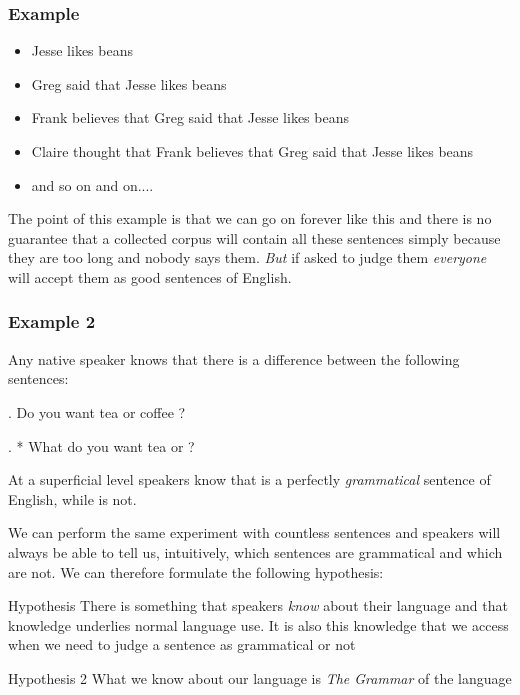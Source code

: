 \begin{frame}
  \frametitle{Example}
  \begin{itemize}
  \item Jesse likes beans \pause
  \item Greg said that Jesse likes beans \pause
  \item Frank believes that Greg said that Jesse likes beans \pause
  \item Claire thought that Frank believes that Greg said that Jesse likes beans
  \item and so on and on....
  \end{itemize}
\end{frame}

\begin{frame}
  The point of this example is that we can go on forever like this and there is no guarantee that a collected corpus will contain all these sentences simply because they are too long and nobody says them. \emph{But} if asked to judge them \textit{everyone} will accept them as good sentences of English.
\end{frame}


\begin{frame}
  \frametitle{Example 2}

Any native speaker knows that there is a difference between the following sentences:

\ex.
Do you want tea or coffee ?

\ex.
* What do you want tea or ?

At a superficial level speakers know that \LLast is a perfectly \textit{grammatical} sentence of English, while \Last is not.
\end{frame}

\begin{frame}
  We can perform the same experiment with countless sentences and speakers will always be able to tell us, intuitively, which sentences are grammatical and which are not.  We can therefore formulate the following hypothesis:
  \begin{block}
    {Hypothesis}
There is something that speakers \textit{know} about their language and that knowledge underlies normal language use.  It is also this knowledge that we access when we need to judge a sentence as grammatical or not
  \end{block}
\pause
  \begin{block}
    {Hypothesis 2}
What we know about our language is \textit{The Grammar} of the language
  \end{block}
\end{frame}

